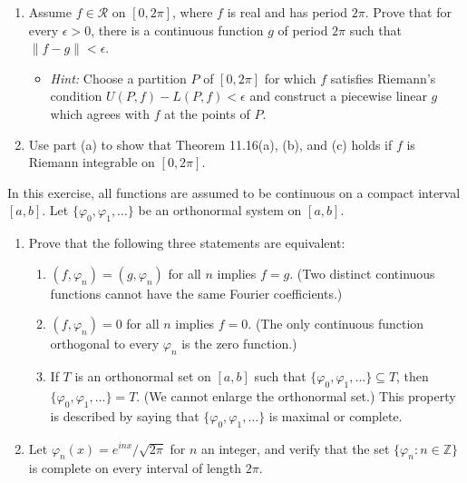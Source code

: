 \begin{problembox}
\begin{enumerate}[label=(\alph*)]
\item Assume $f \in \mathcal{R}$ on $[0, 2\pi]$, where $f$ is real and has period $2\pi$. Prove that for every $\epsilon > 0$, there is a continuous function $g$ of period $2\pi$ such that $\|f - g\| < \epsilon$.
\begin{itemize}
\item \textit{Hint:} Choose a partition $P$ of $[0, 2\pi]$ for which $f$ satisfies Riemann's condition $U(P, f) - L(P, f) < \epsilon$ and construct a piecewise linear $g$ which agrees with $f$ at the points of $P$.
\end{itemize}
\item Use part (a) to show that Theorem 11.16(a), (b), and (c) holds if $f$ is Riemann integrable on $[0, 2\pi]$.
\end{enumerate}
\end{problembox}

\begin{problembox}
In this exercise, all functions are assumed to be continuous on a compact interval $[a, b]$. Let $\{\varphi_0, \varphi_1, \dots\}$ be an orthonormal system on $[a, b]$.
\begin{enumerate}[label=(\alph*)]
\item Prove that the following three statements are equivalent:
\begin{enumerate}[label=\arabic*)]
\item $(f, \varphi_n) = (g, \varphi_n)$ for all $n$ implies $f = g$. (Two distinct continuous functions cannot have the same Fourier coefficients.)
\item $(f, \varphi_n) = 0$ for all $n$ implies $f = 0$. (The only continuous function orthogonal to every $\varphi_n$ is the zero function.)
\item If $T$ is an orthonormal set on $[a, b]$ such that $\{\varphi_0, \varphi_1, \dots\} \subseteq T$, then $\{\varphi_0, \varphi_1, \dots\} = T$. (We cannot enlarge the orthonormal set.) This property is described by saying that $\{\varphi_0, \varphi_1, \dots\}$ is maximal or complete.
\end{enumerate}
\item Let $\varphi_n(x) = e^{inx}/\sqrt{2\pi}$ for $n$ an integer, and verify that the set $\{\varphi_n : n \in \mathbb{Z}\}$ is complete on every interval of length $2\pi$.
\end{enumerate}
\end{problembox}

